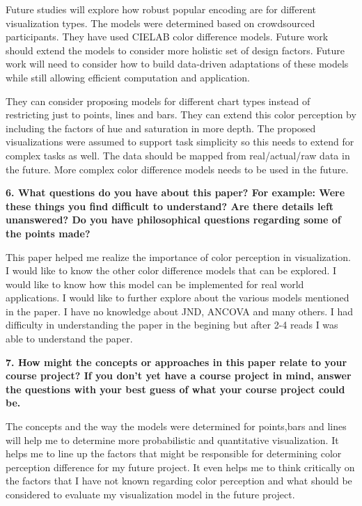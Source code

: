 \documentclass{article}[12pt]
\begin{document}
{
	Future studies will explore how robust popular encoding are for different visualization types.
	The models were determined based on crowdsourced participants. 
	They have used CIELAB color difference models. 
	Future work should extend the models to consider more holistic set of design factors.
	Future work will need to consider how to build data-driven adaptations of these models while still allowing efficient computation and application.
	
	They can consider proposing models for different chart types instead of restricting just to points, lines and bars. They can extend this color perception by including the factors of hue and saturation in more depth. The proposed visualizations were assumed to support task simplicity so this needs to extend for complex tasks as well. The data should be mapped from real/actual/raw data in the future. More complex color difference models needs to be used in the future.

}



\vspace{2ex}\noindent
{\bf 6. What questions do you have about this paper? For example: Were these things
   you find difficult to understand? Are there details left unanswered? Do you
have philosophical questions regarding some of the points made? }


{
    This paper helped me realize the importance of color perception in visualization. 
    I would like to know the other color difference models that can be explored.
    I would like to know how this model can be implemented for real world applications.
    I would like to further explore about the various models mentioned in the paper.
    I have no knowledge about JND, ANCOVA and many others. I had difficulty in understanding the paper in the begining but after 2-4 reads I was able to understand the paper.
    

}



\vspace{2ex}\noindent
{\bf 7. How might the concepts or approaches in this paper relate to your course
   project? If you don't yet have a course project in mind, answer the
questions with your best guess of what your course project could be. }

{
	The concepts and the way the models were determined for points,bars and lines will help me to determine more probabilistic and quantitative visualization. It helps me to line up the factors that might be responsible for determining color perception difference for my future project. It even helps me to think critically on the factors that I have not known regarding color perception and what should be considered to evaluate my visualization model in the future project.

}
\end{document}
